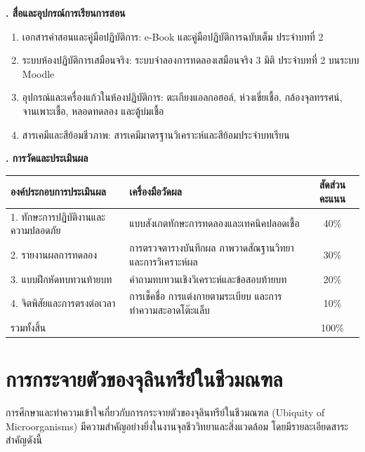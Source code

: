 \noindent\textbf{. สื่อและอุปกรณ์การเรียนการสอน}

\begin{enumerate}
    \item เอกสารคำสอนและคู่มือปฏิบัติการ: e-Book และคู่มือปฏิบัติการฉบับเต็ม ประจำบทที่ 2
    \item ระบบห้องปฏิบัติการเสมือนจริง: ระบบจำลองการทดลองเสมือนจริง 3 มิติ ประจำบทที่ 2 บนระบบ Moodle
    \item อุปกรณ์และเครื่องแก้วในห้องปฏิบัติการ: ตะเกียงแอลกอฮอล์, ห่วงเขี่ยเชื้อ, กล้องจุลทรรศน์, จานเพาะเชื้อ, หลอดทดลอง และตู้บ่มเชื้อ
    \item สารเคมีและสีย้อมชีวภาพ: สารเคมีมาตรฐานวิเคราะห์และสีย้อมประจำบทเรียน
\end{enumerate}

\noindent\textbf{. การวัดและประเมินผล}

\begin{table}[H]
\centering\small
\begin{tabularx}{\textwidth}{p{} p{} c}
\toprule
\textbf{องค์ประกอบการประเมินผล} & \textbf{เครื่องมือวัดผล} & \textbf{สัดส่วนคะแนน} \\
\midrule
1. ทักษะการปฏิบัติงานและความปลอดภัย & แบบสังเกตทักษะการทดลองและเทคนิคปลอดเชื้อ & 40\% \\
2. รายงานผลการทดลอง & การตรวจตารางบันทึกผล ภาพวาดสัณฐานวิทยา และการวิเคราะห์ผล & 30\% \\
3. แบบฝึกหัดทบทวนท้ายบท & คำถามทบทวนเชิงวิเคราะห์และข้อสอบท้ายบท & 20\% \\
4. จิตพิสัยและการตรงต่อเวลา & การเช็คชื่อ การแต่งกายตามระเบียบ และการทำความสะอาดโต๊ะแล็บ & 10\% \\
รวมทั้งสิ้น &  & 100\% \\
\bottomrule
\end{tabularx}
\end{table}

\newpage


\section{การกระจายตัวของจุลินทรีย์ในชีวมณฑล}

การศึกษาและทำความเข้าใจเกี่ยวกับการกระจายตัวของจุลินทรีย์ในชีวมณฑล (Ubiquity of Microorganisms) มีความสำคัญอย่างยิ่งในงานจุลชีววิทยาและสิ่งแวดล้อม โดยมีรายละเอียดสาระสำคัญดังนี้

